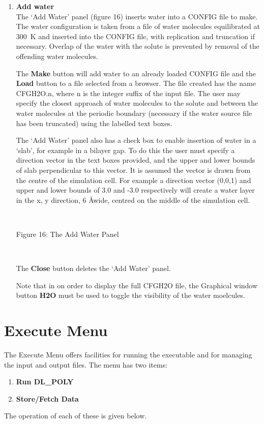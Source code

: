 \begin{enumerate}
~


\item {\bf Add water} \\
The `Add Water' panel (figure 16) inserts water into a CONFIG file to
make. The water configuration is taken from a file of water molecules
equilibrated at 300~K and inserted into the CONFIG file, with
replication and truncation if necessary. Overlap of the water with the
solute is prevented by removal of the offending water molecules.

The {\bf Make} button will add water to an already loaded CONFIG file
and the {\bf Load} button to a file selected from a browser. The file
created has the name CFGH2O.n, where n is the integer suffix of the
input file. The user may specify the closest approach of water
molecules to the solute and between the water molecules at the
periodic boundary (necessary if the water source file has been
truncated) using the labelled text boxes.

The `Add Water' panel also has a check box to enable insertion of
water in a `slab', for example in a bilayer gap. To do this the
user must specify a direction vector in the text boxes provided, and
the upper and lower bounds of slab perpendicular to this vector. It is
assumed the vector is drawn from the centre of the simulation
cell. For example a direction vector (0,0,1) and upper and lower
bounds of 3.0 and -3.0 respectively will create a water layer in the
x, y direction, 6 \AA wide, centred on the middle of the
simulation cell. 

~

\vskip 5mm
\centerline{}
\centerline{Figure 16: The Add Water Panel}
\vskip 5mm

~

\noindent

The {\bf Close} button deletes the `Add Water' panel.

Note that in on order to display the full CFGH2O file, 
the Graphical window button {\bf H2O} must be used
to toggle the visibility of the water moelcules.
\end{enumerate}
\section{Execute Menu}
The Execute Menu offers facilities for running the \DD{} executable and
for managing the input and output files. The menu has two items:
\begin{enumerate}
\item {\bf Run DL\_POLY}
\item {\bf Store/Fetch Data}
\end{enumerate}
The operation of each of these is given below.
